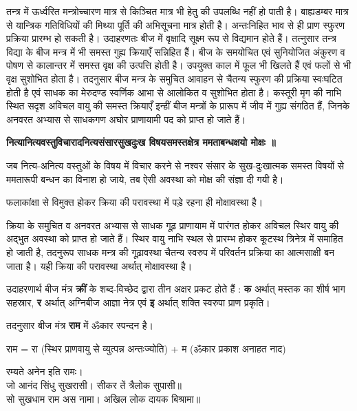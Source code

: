 \documentclass[makeidx, 10pt, oneside, onecolumn, openright, final, svgnames, dvipsnames, extrafontsizes]{memoir}
\begin{document}
\hspace{5mm} तन्त्र में ऊर्ध्वरित मन्त्रोच्चारण मात्र से किञ्चित मात्र भी हेतु की उपलब्धि नहीं हो पाती है। बाह्यडम्बर मात्र से यान्त्रिक गतिविधियों की मिथ्या पूर्ति की अभिसूचना मात्र होती है। अन्तःनिहित भाव से ही प्राण स्फुरण प्रक्रिया प्रारम्भ हो सकती है। उदाहरणतः बीज में वृक्षादि सूक्ष्म रूप से विद्यमान होते हैं। तत्नुसार तन्त्र विद्या के बीज मन्त्र में भी समस्त गुह्य क्रियाएँ सन्निहित हैं।  बीज के समयोचित एवं सुनियोजित अंकुरण व पोषण से कालान्तर में समस्त वृक्ष की उत्पत्ति होती है। उपयुक्त काल में फूल भी खिलते हैं एवं फलों से भी वृक्ष सुशोभित होता है। तदनुसार बीज मन्त्र के समुचित आवाहन से चैतन्य स्फुरण की प्रक्रिया स्वःघटित होती है एवं साधक का मेरुदण्ड स्वर्णिक आभा से आलोकित व सुशोभित होता है। कस्तूरी मृग की नाभि स्थित सदृश अविचल वायु की समस्त क्रियाएँ इन्हीं बीज मन्त्रों के प्रारूप में जीव में गुह्य संगठित हैं, जिनके अनवरत अभ्यास से साधकगण अघोर प्राणायामी पद को प्राप्त हो जाते हैं।   

\begin{center}
\small \bfseries नित्यानित्यवस्तुविचारादनित्यसंसारसुखदुःख विषयसमस्तक्षेत्र ममताबन्धक्षयो मोक्षः ॥
\end{center}

जब नित्य-अनित्य वस्तुओं के विषय में विचार करने से नश्वर संसार के सुख-दुःखात्मक समस्त विषयों से ममतारूपी बन्धन का विनाश हो जाये, तब ऐसी अवस्था को मोक्ष की संज्ञा दी गयी है। 

फलाकांक्षा से विमुक्त होकर क्रिया की परावस्था में पड़े रहना ही मोक्षावस्था है। 

क्रिया के समुचित व अनवरत अभ्यास से साधक गूढ़ प्राणायाम में पारंगत होकर अविचल स्थिर वायु की अद्भुत अवस्था को प्राप्त हो जाते हैं।  स्थिर वायु नाभि स्थल से प्रारम्भ होकर कूटस्थ त्रिनेत्र में समाहित हो जाती है, तदनुरूप साधक मन्त्र की गूढ़ावस्था चैतन्य स्वरुप में परिवर्तन प्रक्रिया का आत्मसाक्षी बन जाता है।  यही क्रिया की परावस्था अर्थात् मोक्षावस्था है।    

उदाहरणार्थ बीज मंत्र \textbf{क्रीं} के शब्द-विच्छेद द्वारा तीन अक्षर प्रकट होते हैं : \textbf{क} अर्थात् मस्तक का शीर्ष भाग सहस्रार, \textbf{र} अर्थात् अग्निबीज आज्ञा नेत्र एवं \textbf{इ} अर्थात् शक्ति स्वरुपा प्राण प्रकृति। 

तदनुसार बीज मंत्र \textbf{राम} में ॐकार स्पन्दन है। 

राम = रा (स्थिर प्राणवायु से व्युत्पन्न अन्तःज्योति) + म (ॐकार प्रकाश अनाहत नाद) 

\begin{center}
रम्यते अनेन इति रामः। \\
जो आनंद सिंधु सुखरासी। सीकर तें त्रैलोक सुपासी॥ \\
सो सुखधाम राम अस नामा। अखिल लोक दायक बिश्रामा॥ 
\end{center}
\end{document}
